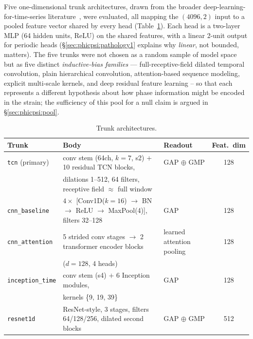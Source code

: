 Five one-dimensional trunk architectures, drawn from the broader deep-learning-for-time-series literature~\citep{ismailfawaz2019deep}, were evaluated, all mapping the $(4096, 2)$ input to a pooled feature vector shared by every head (Table~\ref{tab:phicpsi:trunks}).
Each head is a two-layer MLP (64 hidden units, ReLU) on the shared features, with a linear 2-unit output for periodic heads (\S\ref{sec:phicpsi:pathology1} explains why \emph{linear}, not bounded, matters).
The five trunks were not chosen as a random sample of model space but as five distinct \emph{inductive-bias families} --- full-receptive-field dilated temporal convolution, plain hierarchical convolution, attention-based sequence modeling, explicit multi-scale kernels, and deep residual feature learning – so that each represents a different hypothesis about how phase information might be encoded in the strain; the sufficiency of this pool for a null claim is argued in \S\ref{sec:phicpsi:pool}.

\begin{table}[tbp]
    \centering
    \caption{Trunk architectures.}
    \label{tab:phicpsi:trunks}
    \small
    \begin{tabular}{@{}lllc@{}}
        \toprule
        Trunk                    & Body                                                                                   & Readout                   & Feat.\ dim \\
        \midrule
        \texttt{tcn} (primary)   & conv stem (64ch, $k{=}7$, s2) $+$ 10 residual TCN blocks, & GAP $\oplus$ GMP & 128 \\
        & dilations 1--512, 64 filters, receptive field $\approx$ full window~\citep{bai2018tcn} &                   &            \\
        \texttt{cnn\_baseline}   & $4\times$ [Conv1D($k{=}16$) $\to$ BN $\to$ ReLU $\to$ MaxPool(4)], filters 32--128 & GAP & 128 \\
        \texttt{cnn\_attention}  & 5 strided conv stages $\to$ 2 transformer encoder blocks                  & learned attention pooling & 128 \\
        & ($d{=}128$, 4 heads)~\citep{vaswani2017attention}                                      &                           &            \\
        \texttt{inception\_time} & conv stem (s4) $+$ 6 Inception modules,                                                & GAP                       & 128        \\
        & kernels \{9, 19, 39\}~\citep{fawaz2019inceptiontime}                                   &                           &            \\
        \texttt{resnet1d}        & ResNet-style, 3 stages, filters 64/128/256, dilated second blocks~\citep{he2016resnet} & GAP $\oplus$ GMP & 512 \\
        \bottomrule
    \end{tabular}
\end{table}

